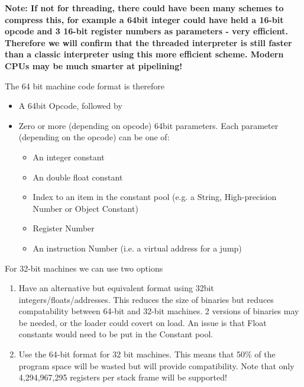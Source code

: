 \textbf{Note: If not for threading, there could have been many schemes to compress this,
for example a 64bit integer could have held a 16-bit opcode and 3 16-bit register
numbers as parameters - very efficient. Therefore we will confirm that the
threaded interpreter is still faster than a classic interpreter using this more
efficient scheme. Modern CPU\textquotesingle{}s may be much smarter at pipelining!}

The 64 bit machine code format is therefore

\begin{itemize}
\item A 64bit Opcode, followed by

\item Zero or more (depending on opcode) 64bit parameters. Each parameter (depending on
the opcode) can be one of:

\begin{itemize}
\item An integer constant

\item An double float constant

\item Index to an item in the constant pool (e.g. a String, High-precision Number
or Object Constant)

\item Register Number

\item An instruction Number (i.e. a virtual address for a jump)

\end{itemize}

\end{itemize}

For 32-bit machines we can use two options

\begin{enumerate}
\item Have an alternative but equivalent format using 32bit integers/floats/addresses.
This reduces the size of binaries but reduces compatability between 64-bit and
32-bit machines. 2 versions of binaries may be needed, or the loader could covert
on load. An issue is that Float constants would need to be put in the Constant
pool.

\item Use the 64-bit format for 32 bit machines. This means that 50\% of the program
space will be wasted but will provide compatibility. Note that only
4,294,967,295 registers per stack frame will be supported!

\end{enumerate}

